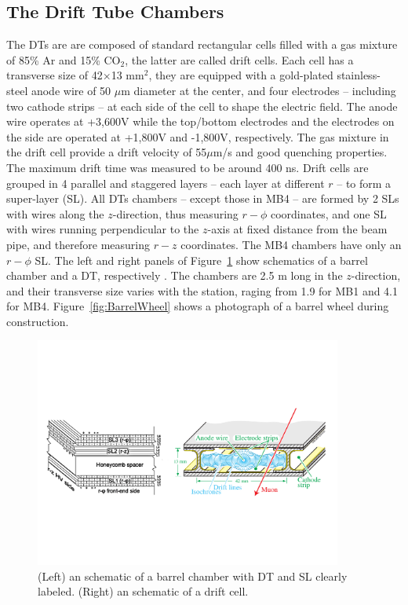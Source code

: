 \subsection{The Drift Tube Chambers}
The DTs are are composed of standard rectangular cells filled with a gas mixture of
85\% Ar and 15\% CO$_{2}$, the latter are called drift cells. Each cell
has a transverse size of 42$\times$13 mm$^{2}$, they are equipped with
a gold-plated stainless-steel anode wire of 50 $\mu$m diameter at the
center, and four electrodes -- including two cathode strips -- at each
side of the cell to shape the electric field. The anode wire operates
at +3,600\unit{V} while the top/bottom electrodes and the electrodes
on the side are operated at +1,800\unit{V} and -1,800\unit{V},
respectively. The gas mixture in the drift cell provide a drift
velocity of 55$\mu$m/s and good quenching properties. The maximum
drift time was measured to be around 400 ns. Drift cells are grouped
in 4 parallel and staggered layers -- each layer at different $r$ --
to form a super-layer (SL). All DTs chambers -- except those in MB4 -- are formed by 2 SLs
with wires along the $z$-direction, thus measuring $r-\phi$
coordinates, and one SL with wires running perpendicular to the
$z$-axis at fixed distance from the beam pipe, and therefore measuring
$r-z$ coordinates. The MB4 chambers have only an $r-\phi$
SL. The left and right panels of Figure~\ref{fig:DTandSL} show schematics of a barrel chamber and
a DT, respectively . The
chambers are 2.5 m long in the $z$-direction, and their transverse
size varies with the station, raging from 1.9 for MB1 and 4.1 for
MB4. Figure~\ref{fig:BarrelWheel} shows a photograph of a barrel wheel during
construction.
\begin{figure}
 \centering
\includegraphics[width=0.9\textwidth]{CMS_DetectorFigures/DriftTube.pdf}
\caption{(Left) an schematic of a barrel chamber with DT and SL
  clearly labeled. (Right) an schematic of a drift cell.\label{fig:DTandSL}}
\end{figure}

